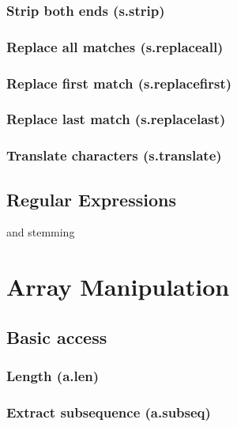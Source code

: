 \documentclass{article}
\theoremstyle{definition}
\begin{document}
\subsubsection{Strip both ends (s.strip)}

\subsubsection{Replace all matches (s.replaceall)}

\subsubsection{Replace first match (s.replacefirst)}

\subsubsection{Replace last match (s.replacelast)}

\subsubsection{Translate characters (s.translate)}

\subsection{Regular Expressions}

and stemming

\pagebreak

\section{Array Manipulation}

\subsection{Basic access}

\subsubsection{Length (a.len)}

\subsubsection{Extract subsequence (a.subseq)}
\end{document}

